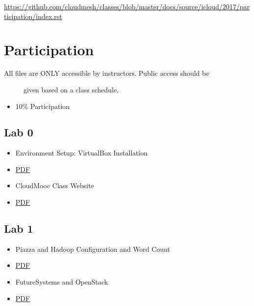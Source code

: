 \begin{fileremark}\url{https://github.com/cloudmesh/classes/blob/master/docs/source/icloud/2017/participation/index.rst}\end{fileremark}
\section{Participation}\label{participation}

\begin{description}
\item[All files are ONLY accessible by instructors. Public access should
be]
given based on a class schedule.
\end{description}

\begin{itemize}
\tightlist
\item
  10\% Participation
\end{itemize}

\subsection{Lab 0}\label{lab-0}

\begin{itemize}
\tightlist
\item
  Environment Setup: VirtualBox Installation
\item
  \href{https://drive.google.com/open?id=0B88HKpainTSfRFgwX0IxaWM5TFE}{PDF}
\item
  CloudMooc Class Website
\item
  \href{https://drive.google.com/open?id=0B88HKpainTSfS3hNb2tVSW9GcE0}{PDF}
\end{itemize}

\subsection{Lab 1}\label{lab-1}

\begin{itemize}
\tightlist
\item
  Piazza and Hadoop Configuration and Word Count
\item
  \href{https://drive.google.com/open?id=0B88HKpainTSfMzVSa1pYM0tfMzg}{PDF}
\item
  FutureSystems and OpenStack
\item
  \href{https://drive.google.com/open?id=0B88HKpainTSfNEhmeHBveXRSSUk}{PDF}
\end{itemize}

